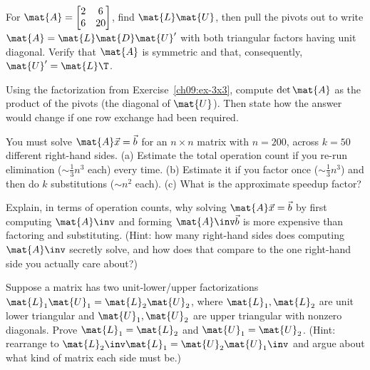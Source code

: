 \begin{exercise}
\label{ch09:ex-ldu}
For $\mat{A}=\begin{bmatrix} 2 & 6 \\ 6 & 20 \end{bmatrix}$, find $\mat{L}\mat{U}$, then pull
the pivots out to write $\mat{A}=\mat{L}\mat{D}\mat{U}'$ with both triangular factors having
unit diagonal. Verify that $\mat{A}$ is symmetric and that, consequently, $\mat{U}'=\mat{L}\T$.
\end{exercise}

\begin{exercise}
\label{ch09:ex-det}
Using the factorization from Exercise~\ref{ch09:ex-3x3}, compute $\det\mat{A}$ as the product
of the pivots (the diagonal of $\mat{U}$). Then state how the answer would change if one row
exchange had been required.
\end{exercise}

\begin{exercise}
\label{ch09:ex-cost}
You must solve $\mat{A}\vec{x}=\vec{b}$ for an $n\times n$ matrix with $n=200$, across
$k=50$ different right-hand sides. (a) Estimate the total operation count if you re-run
elimination ($\sim\tfrac13 n^3$ each) every time. (b) Estimate it if you factor once
($\sim\tfrac13 n^3$) and then do $k$ substitutions ($\sim n^2$ each). (c) What is the
approximate speedup factor?
\end{exercise}

\begin{exercise}
\label{ch09:ex-noinvert}
Explain, in terms of operation counts, why solving $\mat{A}\vec{x}=\vec{b}$ by first
computing $\mat{A}\inv$ and forming $\mat{A}\inv\vec{b}$ is more expensive than factoring and
substituting. (Hint: how many right-hand sides does computing $\mat{A}\inv$ secretly solve,
and how does that compare to the one right-hand side you actually care about?)
\end{exercise}

\begin{exercise}
\label{ch09:ex-uniqueness}
Suppose a matrix has two unit-lower/upper factorizations
$\mat{L}_1\mat{U}_1=\mat{L}_2\mat{U}_2$, where $\mat{L}_1,\mat{L}_2$ are unit lower triangular
and $\mat{U}_1,\mat{U}_2$ are upper triangular with nonzero diagonals. Prove $\mat{L}_1=\mat{L}_2$
and $\mat{U}_1=\mat{U}_2$. (Hint: rearrange to $\mat{L}_2\inv\mat{L}_1=\mat{U}_2\mat{U}_1\inv$
and argue about what kind of matrix each side must be.)
\end{exercise}

